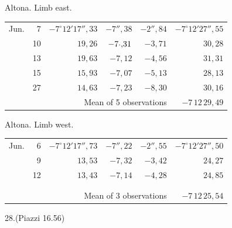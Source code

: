 \noindent\begin{minipage}[t]{.495\textwidth}\centering Altona. Limb east.\par\smallskip
{\scriptsize\setlength{\tabcolsep}{1pt}\renewcommand{\arraystretch}{1.2}\begin{tabular}{lr|r|r|r|r|}
Jun.&7&$-7^\circ12'17''{,}33$&$-7''{,}38$&$-2''{,}84$&$-7^\circ12'27''{,}55$\\
&10&$19{,}26$&$-7\mathord{\text{\raisebox{.3ex}{.}}}{,}31$&$-3{,}71$&$30{,}28$\\
&13&$19{,}63$&$-7{,}12$&$-4{,}56$&$31{,}31$\\
&15&$15{,}93$&$-7{,}07$&$-5{,}13$&$28{,}13$\\
&27&$14{,}63$&$-7{,}23$&$-8{,}30$&$30{,}16$\\
\cline{6-6}\multicolumn{5}{r}{Mean of 5 observations}&$-7\,12\,29{,}49$
\end{tabular}}\end{minipage}\hfill\begin{minipage}[t]{.495\textwidth}\centering Altona. Limb west.\par\smallskip
{\scriptsize\setlength{\tabcolsep}{1pt}\renewcommand{\arraystretch}{1.2}\begin{tabular}{lr|r|r|r|r}
Jun.&6&$-7^\circ12'17''{,}73$&$-7''{,}22$&$-2''{,}55$&$-7^\circ12'27''{,}50$\\
&9&$13{,}53$&$-7{,}32$&$-3{,}42$&$24{,}27$\\
&12&$13{,}43$&$-7{,}14$&$-4{,}28$&$24{,}85$\\
&&&&&\\
&&&&&\\
\cline{6-6}\multicolumn{5}{r}{Mean of 3 observations}&$-7\,12\,25{,}54$
\end{tabular}}\end{minipage}
\par\vspace{4mm}
\begin{center}28.\quad (Piazzi 16.56)\end{center}

